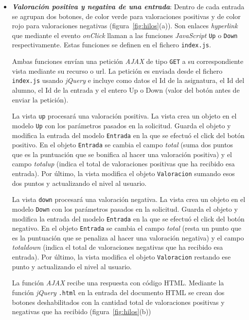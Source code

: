 \documentclass[a4paper, 12pt]{book}
\begin{document}
\begin{itemize}
  \item {\bfseries \textit{Valoraci\'on positiva y negativa de una entrada}}: Dentro de cada entrada se agrupan dos botones, de color verde para 
  valoraciones positivas y de color rojo para valoraciones negativas (figura~\ref{fig:hilos}(a)). Son enlaces \textit{hyperlink} que mediante el evento \textit{onClick} llaman a las 
  funciones \textit{JavaScript} \texttt{Up} o \texttt{Down} respectivamente. Estas funciones se definen en el fichero \texttt{index.js}. 
  
  Ambas funciones env\'ian una petici\'on \textit{AJAX} de tipo \texttt{GET} a su correspondiente vista mediante su recurso o url. La petici\'on es enviada 
  desde el fichero \texttt{index.js} usando \textit{jQuery} e incluye como datos el Id de la asignatura, el Id del alumno, el Id de la entrada y el entero 
  Up o Down (valor del bot\'on antes de enviar la petici\'on).
  
  La vista \texttt{up} procesar\'a una valoraci\'on positiva. La vista crea un objeto en el modelo \texttt{Up} con los par\'ametros pasados en la solicitud. 
  Guarda el objeto y modifica la entrada del modelo \texttt{Entrada} en la que se efectu\'o el click del bot\'on positivo. En el objeto \texttt{Entrada} se
  cambia el campo \textit{total} (suma dos puntos que es la puntuaci\'on que se bonifica al hacer una valoraci\'on positiva) y el campo \textit{totalup} 
  (indica el total de valoraciones positivas que ha recibido esa entrada). Por \'ultimo, la vista modifica el objeto \texttt{Valoracion} sumando esos dos 
  puntos y actualizando el nivel al usuario.
  
  La vista \texttt{down} procesar\'a una valoraci\'on negativa. La vista crea un objeto en el modelo \texttt{Down} con los par\'ametros pasados en la 
  solicitud. Guarda el objeto y modifica la entrada del modelo \texttt{Entrada} en la que se efectu\'o el click del bot\'on negativo. En el objeto 
  \texttt{Entrada} se cambia el campo \textit{total} (resta un punto que es la puntuaci\'on que se penaliza al hacer una valoraci\'on negativa) y el campo 
  \textit{totaldown} (indica el total de valoraciones negativas que ha recibido esa entrada). Por \'ultimo, la vista modifica el objeto \texttt{Valoracion} 
  restando ese punto y actualizando el nivel al usuario.
  
  La funci\'on \textit{AJAX} recibe una respuesta con c\'odigo HTML. Mediante la funci\'on \textit{jQuery} \texttt{.html} en la entrada del documento HTML 
  se crean dos botones deshabilitados con la cantidad total de valoraciones positivas y negativas que ha recibido (figura~\ref{fig:hilos}(b))
  

\end{itemize}
\end{document}
